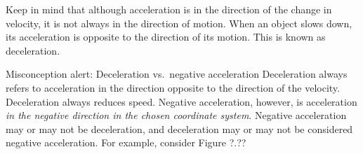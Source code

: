 \documentclass[../../main-ap-physics.tex]{subfiles}
\begin{document}
Keep in mind that although acceleration is in the direction of the change in velocity, it is not always in the direction of motion. When an object slows down, its acceleration is opposite to the direction of its motion. This is known as \gls{deceleration}.

\begin{gradient}{Misconception alert: Deceleration vs.~negative acceleration}
    Deceleration always refers to acceleration in the direction opposite to the direction of the velocity. Deceleration always reduces speed. Negative acceleration, however, is acceleration \textit{in the negative direction in the chosen coordinate system}. Negative acceleration may or may not be deceleration, and deceleration may or may not be considered negative acceleration. For example, consider Figure ?.??

    \begin{center}
        \hspace{1cm}


\end{center}
\end{gradient}
\end{document}
